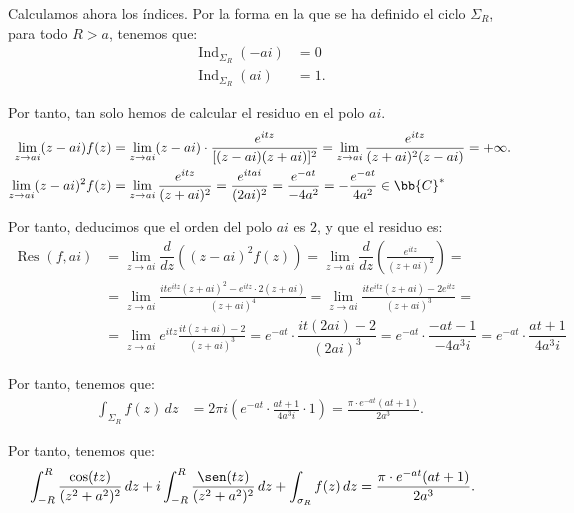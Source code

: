 \documentclass[12pt]{article}
\DeclareMathOperator{\Ind}{Ind}
\DeclareMathOperator{\Res}{Res}
\begin{document}
\begin{ejercicio}[2.5 puntos]
        Calculamos ahora los índices. Por la forma en la que se ha definido el ciclo $\Sigma_R$, para todo $R > a$, tenemos que:
        \begin{align*}
            \Ind_{\Sigma_R}(-ai) &= 0\\
            \Ind_{\Sigma_R}(ai) &= 1.
        \end{align*}

        Por tanto, tan solo hemos de calcular el residuo en el polo $ai$.
        \begin{align*}
            \lim_{z\to ai} (z - ai)f(z) &= \lim_{z\to ai} (z - ai)\cdot \frac{e^{i t z}}{[(z - ai)(z + ai)]^2}
            = \lim_{z\to ai} \frac{e^{i t z}}{(z + ai)^2(z - ai)} = +\infty.\\
            \lim_{z\to ai} (z - ai)^2f(z) &= \lim_{z\to ai} \frac{e^{i t z}}{(z + ai)^2}
            = \frac{e^{i t ai}}{(2ai)^2} = \frac{e^{-at}}{-4a^2} = -\frac{e^{-at}}{4a^2}\in \bb{C}^*
        \end{align*}

        Por tanto, deducimos que el orden del polo $ai$ es $2$, y que el residuo es:
        \begin{align*}
            \Res(f, ai) &= \lim_{z\to ai} \dfrac{d}{dz}\left((z - ai)^2f(z)\right)
            = \lim_{z\to ai} \dfrac{d}{dz}\left(\frac{e^{i t z}}{(z + ai)^2}\right)
            =\\&= \lim_{z\to ai} \frac{i t e^{i t z}(z + ai)^2 - e^{i t z}\cdot 2(z + ai)}{(z + ai)^4}
            = \lim_{z\to ai} \frac{i t e^{i t z}(z + ai) - 2e^{i t z}}{(z + ai)^3}
            =\\&=  \lim_{z\to ai} e^{i t z} \frac{i t (z + ai) - 2}{(z + ai)^3}
            = e^{-at}\cdot \dfrac{i t (2ai) - 2}{(2ai)^3}
            = e^{-at}\cdot \dfrac{-at -1}{-4a^3i}
            = e^{-at}\cdot \dfrac{at+1}{4a^3i}
        \end{align*}

        Por tanto, tenemos que:
        \begin{align*}
            \int_{\Sigma_R} f(z) \, dz &= 2\pi i\left(e^{-at}\cdot\frac{at + 1}{4a^3i} \cdot 1\right)
            = \frac{\pi\cdot e^{-at}(at + 1)}{2a^3}.
        \end{align*}

        Por tanto, tenemos que:
        \begin{align*}
            \int_{-R}^{R} \frac{\cos(t z)}{(z^2 + a^2)^2} \, dz + i\int_{-R}^{R} \frac{\sen(t z)}{(z^2 + a^2)^2} \, dz + \int_{\sigma_R} f(z) \, dz &= \frac{\pi\cdot e^{-at}(at + 1)}{2a^3}.
        \end{align*}


\end{ejercicio}
\end{document}
